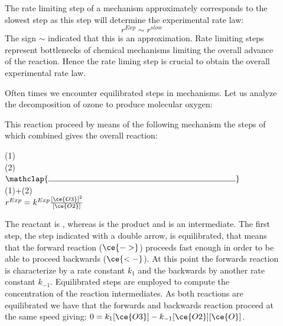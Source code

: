 \documentclass[main.tex]{subfiles}
\newcommand\chapterlabel{Ch-kinetics}
\begin{document}
\begin{description}
\item[] 
The rate limiting step of a mechanism approximately corresponds to the slowest step as this step will determine the experimental rate law:
\begin{equation}
\boxed{  
 r^{Exp}\sim r^{slow}}
\label{\chapterlabel:equation5}
\end{equation}
The sign $\sim$ indicated that this is an approximation. Rate limiting steps represent bottlenecks of chemical mechanisms limiting the overall advance of the reaction. Hence the rate liming step is crucial to obtain the overall experimental rate law.
\item[] 
Often times we encounter equilibrated steps in mechanisms. Let us analyze the decomposition of ozone to produce molecular oxygen:
\begin{center} \end{center}
This reaction proceed by means of the following mechanism the steps of which combined gives the overall reaction:
\begin{center}(1)\hfill{} \\
(2)\hfill{} 
\\$\mathclap{\rule{8cm}{0.4pt}}$\\
(1)+(2)\hfill{}\\{ \hfill $r^{Exp}=k^{Exp}\frac{[\ce{O3}]^2}{[\ce{O2}]}$} 
\end{center}
The reactant is , whereas  is the product and  is an intermediate. The first step, the step indicated with a double arrow,  is equilibrated, that means that the forward reaction ($\ce{->}$) proceeds fast enough in order to be able to proceed backwards ($\ce{<-}$). At this point the forwards reaction is characterize by a rate constant $k_1$ and the backwards by another rate constant $k_{-1}$. 
Equilibrated steps are employed to compute the concentration of the reaction intermediates.
As both reactions are equilibrated we have that the forwards and backwards reaction proceed at the same speed giving: $0=k_1[\ce{O3}]-k_{-1}[\ce{O2}][\ce{O}]$. 

\end{description}
\end{document}
